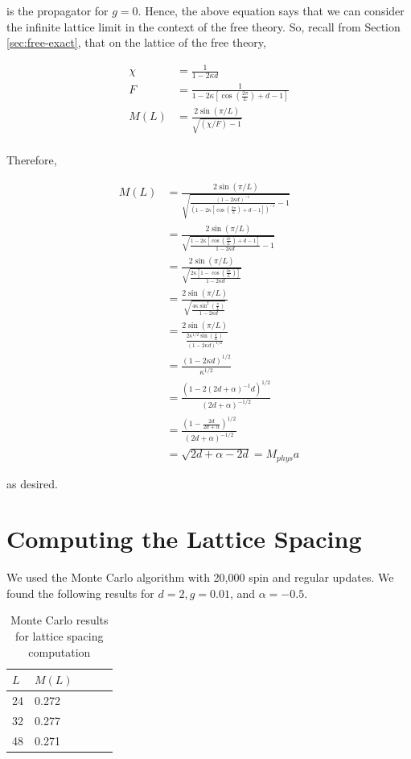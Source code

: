 \documentclass[12]{report}
\newcommand\0{\mathbf{0}}
\newcommand\<{\langle}
\renewcommand\>{\rangle}
\begin{document}
is the propagator for $g = 0$. Hence, the above equation says that we can consider the infinite lattice limit in the context of the free theory. So, recall from Section \ref{sec:free-exact}, that on the lattice of the free theory,

\begin{align*}
\chi &= \frac{1}{1 - 2\kappa d}	\\
F &= \frac{1}{1 - 2\kappa [\cos(\frac{2\pi}{L}) + d-1]} \\
M(L) &= \frac{2 \sin (\pi / L)}{\sqrt{(\chi / F) - 1}} \\
\end{align*}

Therefore,

\begin{align*}
M(L) &= \frac{2 \sin (\pi / L)}{\sqrt{\frac{(1 - 2\kappa d)^{-1}}{ (1 - 2\kappa [\cos(\frac{2\pi}{L}) + d-1])^{-1}} - 1}}  \\
&= 	\frac{2 \sin (\pi / L)}{\sqrt{\frac{1 - 2\kappa [\cos(\frac{2\pi}{L}) + d-1]}{1 - 2\kappa d} - 1}} \\
&= \frac{2 \sin (\pi / L)}{\sqrt{\frac{2\kappa [1 - \cos(\frac{2\pi}{L})]}{1 - 2\kappa d}}} \\
&= \frac{2 \sin (\pi / L)}{\sqrt{\frac{4\kappa \sin^2(\frac{\pi}{L})}{1 - 2\kappa d}}} \\
&= \frac{2 \sin (\pi / L)}{\frac{2\kappa^{1/2} \sin(\frac{\pi}{L})}{(1 - 2\kappa d)^{1/2}}} \\
&= \frac{(1-2\kappa d)^{1/2}}{\kappa^{1/2}} \\
&= \frac{(1-2(2d + \alpha )^{-1} d)^{1/2}}{(2d + \alpha )^{-1/2}} \\
&= \frac{(1-\frac{2d}{2d + \alpha})^{1/2}}{(2d + \alpha )^{-1/2}} \\
&= \sqrt{2d + \alpha - 2d} = M_{phys}a
\end{align*}

as desired.

                                                                                                                                                                       
\section{Computing the Lattice Spacing}

We used the Monte Carlo algorithm with 20,000 spin and regular updates. We found the following results for $d=2, g = 0.01$, and $\alpha = -0.5$.


\begin{table}[H]
\centering
\begin{tabular}{|l|l|l|l|l|}
\hline
$L$ & $M(L)$ \\ \hline
24   & 0.272 \\
32   & 0.277  \\
48   & 0.271 \\ \hline
\end{tabular}
\caption{Monte Carlo results for lattice spacing computation}
\end{table}
\end{document}
